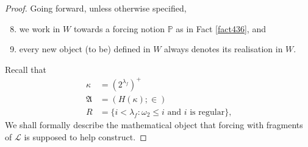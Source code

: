 \documentclass[12pt]{article}
\numberwithin{equation}{section}
\begin{document}
\begin{proof}
Going forward, unless otherwise specified, 
\begin{enumerate}[label=(\Alph*)]
    \setcounter{enumi}{7}
    \item we work in $W$ towards a forcing notion $\mathbb{P}$ as in Fact \ref{fact436}, and
    \item every new object (to be) defined in $W$ always denotes its realisation in $W$. 
\end{enumerate}
Recall that
\begin{align*}
    \kappa & = (2^{\lambda_f})^+ \\
    \mathfrak{A} & = (H(\kappa); \in) \\
    R & = \{i < \lambda_f : \omega_2 \leq i \text{ and } i \text{ is regular}\} \text{,}
\end{align*}
We shall formally describe the mathematical object that forcing with fragments of $\mathcal{L}$ is supposed to help construct. 


\end{proof}
\end{document}
